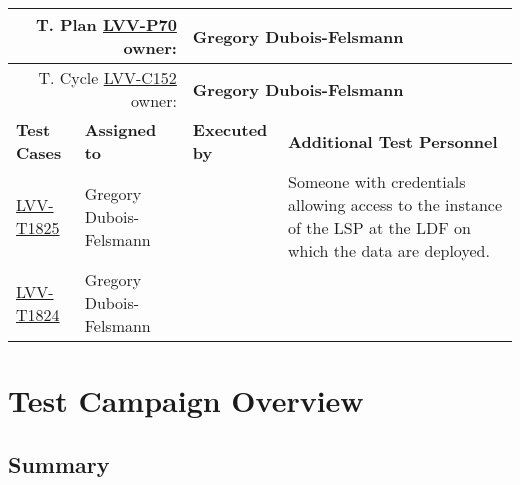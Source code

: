 \documentclass[DM,lsstdraft,STR,toc]{lsstdoc}
\begin{document}
{\small
\begin{longtable}{p{3cm}p{3cm}p{3cm}p{6cm}}
\hline
\multicolumn{2}{r}{T. Plan \href{https://jira.lsstcorp.org/secure/Tests.jspa\#/testPlan/LVV-P70}{LVV-P70} owner:} &
\multicolumn{2}{l}{\textbf{ Gregory Dubois-Felsmann } }\\\hline
\multicolumn{2}{r}{T. Cycle \href{https://jira.lsstcorp.org/secure/Tests.jspa\#/testCycle/LVV-C152}{LVV-C152} owner:} &
\multicolumn{2}{l}{\textbf{
Gregory Dubois-Felsmann}
} \\\hline
\textbf{Test Cases} & \textbf{Assigned to} & \textbf{Executed by} & \textbf{Additional Test Personnel} \\ \hline
\href{https://jira.lsstcorp.org/secure/Tests.jspa#/testCase/LVV-T1825}{LVV-T1825}
& {\small Gregory Dubois-Felsmann } & {\small  } &
\begin{minipage}[]{6cm}
\smallskip
{\small Someone with credentials allowing access to the instance of the LSP at
the LDF on which the data are deployed. }
\medskip
\end{minipage}
\\ \hline
\href{https://jira.lsstcorp.org/secure/Tests.jspa#/testCase/LVV-T1824}{LVV-T1824}
& {\small Gregory Dubois-Felsmann } & {\small  } &
\begin{minipage}[]{6cm}
\smallskip
{\small  }
\medskip
\end{minipage}
\\ \hline
\end{longtable}
}

\newpage

\section{Test Campaign Overview}
\label{sect:overview}

\subsection{Summary}
\label{sect:summarytable}
\end{document}
